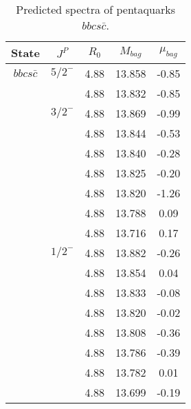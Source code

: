 \documentclass[prd,twocolumn,floatfix,nofootinbib]{revtex4}
\begin{document}
\renewcommand{\tabcolsep}{0.5cm}
\renewcommand{\arraystretch}{1.2}
\begin{table*}[!htbp]
    \caption{Predicted spectra of pentaquarks $bbcs\bar{c}$.}
    \begin{tabular}{ccccc}
        \hline\hline
        {\rm State} &$J^{P}$ &$R_{0}$ &$M_{bag}$ &$\mu_{bag}$ \\ \hline
        ${bbcs\bar{c}}$
            &${5/2}^{-}$    &4.88   &13.858 &-0.85 \\
            &               &4.88   &13.832 &-0.85 \\
            &${3/2}^{-}$    &4.88   &13.869 &-0.99 \\
            &               &4.88   &13.844 &-0.53 \\
            &               &4.88   &13.840 &-0.28 \\
            &               &4.88   &13.825 &-0.20 \\
            &               &4.88   &13.820 &-1.26 \\
            &               &4.88   &13.788 &0.09 \\
            &               &4.88   &13.716 &0.17 \\
            &${1/2}^{-}$    &4.88   &13.882 &-0.26 \\
            &               &4.88   &13.854 &0.04 \\
            &               &4.88   &13.833 &-0.08 \\
            &               &4.88   &13.820 &-0.02 \\
            &               &4.88   &13.808 &-0.36 \\
            &               &4.88   &13.786 &-0.39 \\
            &               &4.88   &13.782 &0.01 \\
            &               &4.88   &13.699 &-0.19 \\
        \hline\hline 
    \end{tabular}
\end{table*}
\end{document}
